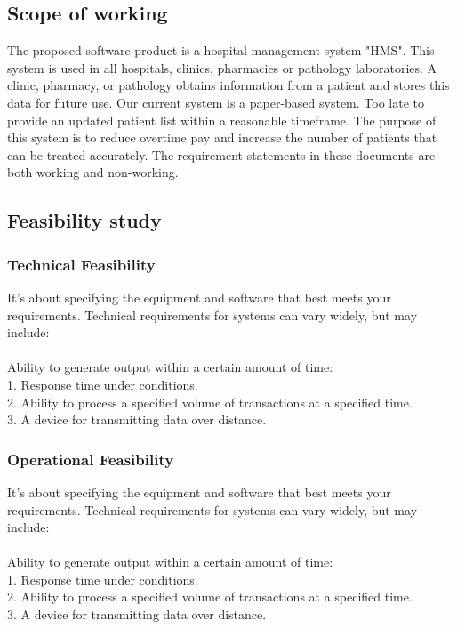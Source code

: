 \documentclass{article}
\begin{document}
\subsection{Scope of working}
The proposed software product is a hospital management system "HMS". This system is used in all hospitals, clinics, pharmacies or pathology laboratories. A clinic, pharmacy, or pathology obtains information from a patient and stores this data for future use. Our current system is a paper-based system. Too late to provide an updated patient list within a reasonable timeframe. The purpose of this system is to reduce overtime pay and increase the number of patients that can be treated accurately. The requirement statements in these documents are both working and non-working.

\newpage
\subsection{Feasibility study }
\subsubsection{Technical Feasibility}
It's about specifying the equipment and software that best meets your requirements. Technical requirements for systems can vary widely, but may include:\\\\
Ability to generate output within a certain amount of time:\\
1. Response time under conditions.\\
2. Ability to process a specified volume of transactions at a specified time.\\
3. A device for transmitting data over distance.\\
\subsubsection{Operational Feasibility}
It's about specifying the equipment and software that best meets your requirements. Technical requirements for systems can vary widely, but may include:\\\\
Ability to generate output within a certain amount of time:\\
1. Response time under conditions.\\
2. Ability to process a specified volume of transactions at a specified time.\\
3. A device for transmitting data over distance. \\
\end{document}
